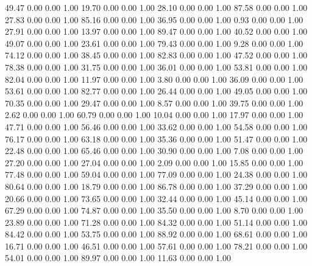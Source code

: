    49.47   0.00   0.00   1.00
   19.70   0.00   0.00   1.00
   28.10   0.00   0.00   1.00
   87.58   0.00   0.00   1.00
   27.83   0.00   0.00   1.00
   85.16   0.00   0.00   1.00
   36.95   0.00   0.00   1.00
    0.93   0.00   0.00   1.00
   27.91   0.00   0.00   1.00
   13.97   0.00   0.00   1.00
   89.47   0.00   0.00   1.00
   40.52   0.00   0.00   1.00
   49.07   0.00   0.00   1.00
   23.61   0.00   0.00   1.00
   79.43   0.00   0.00   1.00
    9.28   0.00   0.00   1.00
   74.12   0.00   0.00   1.00
   38.45   0.00   0.00   1.00
   82.83   0.00   0.00   1.00
   47.52   0.00   0.00   1.00
   78.38   0.00   0.00   1.00
   31.75   0.00   0.00   1.00
   36.01   0.00   0.00   1.00
   53.81   0.00   0.00   1.00
   82.04   0.00   0.00   1.00
   11.97   0.00   0.00   1.00
    3.80   0.00   0.00   1.00
   36.09   0.00   0.00   1.00
   53.61   0.00   0.00   1.00
   82.77   0.00   0.00   1.00
   26.44   0.00   0.00   1.00
   49.05   0.00   0.00   1.00
   70.35   0.00   0.00   1.00
   29.47   0.00   0.00   1.00
    8.57   0.00   0.00   1.00
   39.75   0.00   0.00   1.00
    2.62   0.00   0.00   1.00
   60.79   0.00   0.00   1.00
   10.04   0.00   0.00   1.00
   17.97   0.00   0.00   1.00
   47.71   0.00   0.00   1.00
   56.46   0.00   0.00   1.00
   33.62   0.00   0.00   1.00
   54.58   0.00   0.00   1.00
   76.17   0.00   0.00   1.00
   63.18   0.00   0.00   1.00
   35.36   0.00   0.00   1.00
   51.47   0.00   0.00   1.00
   22.48   0.00   0.00   1.00
   65.46   0.00   0.00   1.00
   30.90   0.00   0.00   1.00
    7.08   0.00   0.00   1.00
   27.20   0.00   0.00   1.00
   27.04   0.00   0.00   1.00
    2.09   0.00   0.00   1.00
   15.85   0.00   0.00   1.00
   77.48   0.00   0.00   1.00
   59.04   0.00   0.00   1.00
   77.09   0.00   0.00   1.00
   24.38   0.00   0.00   1.00
   80.64   0.00   0.00   1.00
   18.79   0.00   0.00   1.00
   86.78   0.00   0.00   1.00
   37.29   0.00   0.00   1.00
   20.66   0.00   0.00   1.00
   73.65   0.00   0.00   1.00
   32.44   0.00   0.00   1.00
   45.14   0.00   0.00   1.00
   67.29   0.00   0.00   1.00
   74.87   0.00   0.00   1.00
   35.50   0.00   0.00   1.00
    8.70   0.00   0.00   1.00
   23.89   0.00   0.00   1.00
   71.28   0.00   0.00   1.00
   84.32   0.00   0.00   1.00
   51.14   0.00   0.00   1.00
   84.42   0.00   0.00   1.00
   53.75   0.00   0.00   1.00
   88.92   0.00   0.00   1.00
   68.61   0.00   0.00   1.00
   16.71   0.00   0.00   1.00
   46.51   0.00   0.00   1.00
   57.61   0.00   0.00   1.00
   78.21   0.00   0.00   1.00
   54.01   0.00   0.00   1.00
   89.97   0.00   0.00   1.00
   11.63   0.00   0.00   1.00
